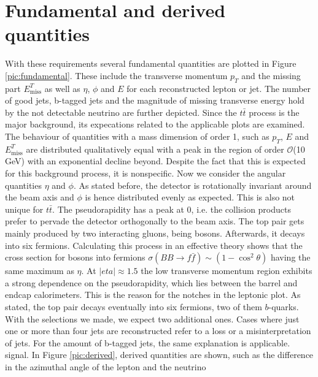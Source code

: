 \section{Fundamental and derived quantities}
With these requirements several fundamental quantities are plotted in Figure \ref{pic:fundamental}. 
These include the transverse momentum $p_T$ and the missing part $E^T_\text{miss}$ as well as $\eta$, $\phi$ and $E$ for each reconstructed lepton or jet.
The number of good jets, b-tagged jets and the magnitude of missing transverse energy hold by the not detectable neutrino are further depicted. 
Since the $t\bar t$ process is the major background, its expecations related to the applicable plots are examined. The behaviour of quantities with
a mass dimension of order 1, such as $p_T$, $E$ and $E^T_\text{miss}$ are distributed qualitatively equal with a peak in the region of order 
$\mathcal{O}$(10 GeV) with an exponential decline beyond. Despite the fact that this is expected for this background process, it is nonspecific.
Now we consider the angular quantities $\eta$ and $\phi$. As stated before, the detector is rotationally invariant around the beam axis and $\phi$ is hence
distributed evenly as expected. This is also not unique for $t\bar t$. The pseudorapidity has a peak at 0, i.e. the collision products prefer to
pervade the detector orthogonally to the beam axis. The top pair gets mainly produced by two interacting gluons, being bosons. Afterwards, it decays into six fermions.
Calculating this process in an effective theory shows that the cross section for bosons into fermions $\sigma(BB\rightarrow f\bar f)\sim (1-\cos^2\theta)$
having the same maximum as $\eta$. 
At $|eta|\approx 1.5$ the low transverse momentum region exhibits a strong dependence on the pseudorapidity, which lies between the barrel and
endcap calorimeters. This is the reason for the notches in the leptonic plot.
As stated, the top pair decays eventually into six fermions, two of them $b$-quarks. With the selections we made, we expect 
two additional ones. Cases where just one or more than four jets are reconstructed refer to a loss or a misinterpretation of jets. For the amount
of b-tagged jets, the same explanation is applicable. %
signal. In Figure \ref{pic:derived}, derived quantities are shown, such as the difference in the azimuthal angle of the lepton and the neutrino
